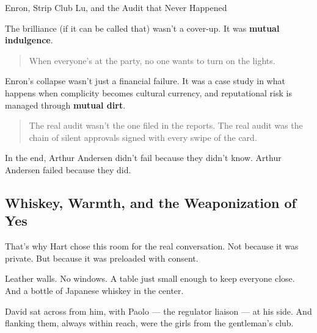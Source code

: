 \begin{HistoricalSidebar}{Enron, Strip Club Lu, and the Audit that Never Happened}
  \medskip
  
  The brilliance (if it can be called that) wasn’t a cover-up. It was \textbf{mutual indulgence}.  
  
  \begin{quote}
  When everyone’s at the party, no one wants to turn on the lights.
  \end{quote}
  
  Enron’s collapse wasn’t just a financial failure. It was a case study in what happens when complicity becomes 
  cultural currency, and reputational risk is managed through \textbf{mutual dirt}.  
  
  \begin{quote}
  The real audit wasn’t the one filed in the reports.  
  The real audit was the chain of silent approvals signed with every swipe of the card.
  \end{quote}
  
  In the end, Arthur Andersen didn’t fail because they didn’t know.  Arthur Andersen failed because they did.
  
\end{HistoricalSidebar}

\medskip

\subsection{Whiskey, Warmth, and the Weaponization of Yes}

That’s why Hart chose this room for the real conversation.  
Not because it was private.  
But because it was preloaded with consent.

Leather walls. No windows. A table just small enough to keep everyone close.  
And a bottle of Japanese whiskey in the center.

David sat across from him, with Paolo — the regulator liaison — at his side.  
And flanking them, always within reach, were the girls from the gentleman's club.

\medskip

